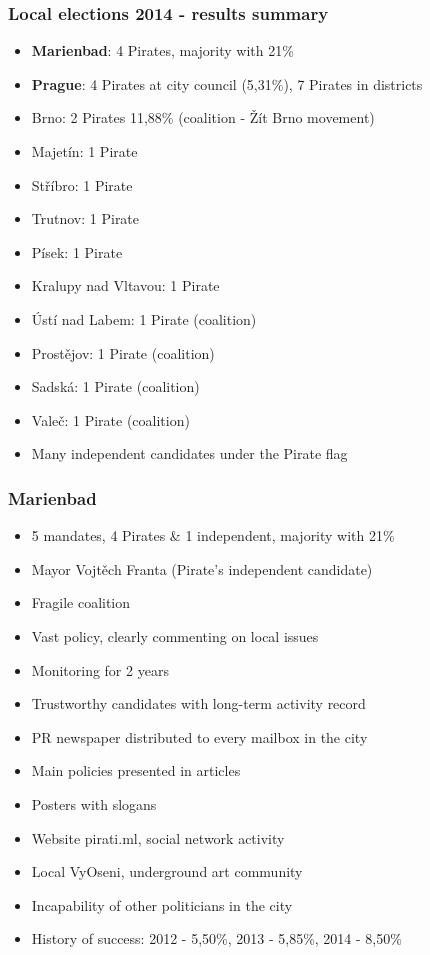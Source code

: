 \begin{frame}
	\frametitle{Local elections 2014 - results summary}
	\begin{itemize}
	\item \textbf{Marienbad}: 4 Pirates, majority with 21\%
	\item \textbf{Prague}: 4 Pirates at city council (5,31\%), 7 Pirates in districts
	\item Brno: 2 Pirates 11,88\% (coalition - \v{Z}\'it Brno movement)
	\item Majet\'in: 1 Pirate
	\item St\v{r}\'ibro: 1 Pirate
	\item Trutnov: 1 Pirate
	\item P\'isek: 1 Pirate
	\item Kralupy nad Vltavou: 1 Pirate
	\item \'Ust\'i nad Labem: 1 Pirate (coalition)
	\item Prost\v{e}jov: 1 Pirate (coalition)
	\item Sadsk\'a: 1 Pirate (coalition)
	\item Vale\v{c}: 1 Pirate (coalition)
	\item Many independent candidates under the Pirate flag
\end{itemize}
\end{frame}
\begin{frame}
	\frametitle{Marienbad}
	\begin{itemize}
	\item 5 mandates, 4 Pirates \& 1 independent, majority with 21\%
	\item Mayor Vojt\v{e}ch Franta (Pirate's independent candidate)
	\item Fragile coalition %
	\item Vast policy, clearly commenting on local issues
	\item Monitoring for 2 years %
	\item Trustworthy candidates with long-term activity record
	\item PR newspaper distributed to every mailbox in the city
	\item Main policies presented in articles
	\item Posters with slogans
	\item Website pirati.ml, social network activity
	\item Local VyOseni, underground art community
	\item Incapability of other politicians in the city
	\item History of success: 2012 - 5,50\%, 2013 - 5,85\%, 2014 - 8,50\%
	\end{itemize}
\end{frame}
